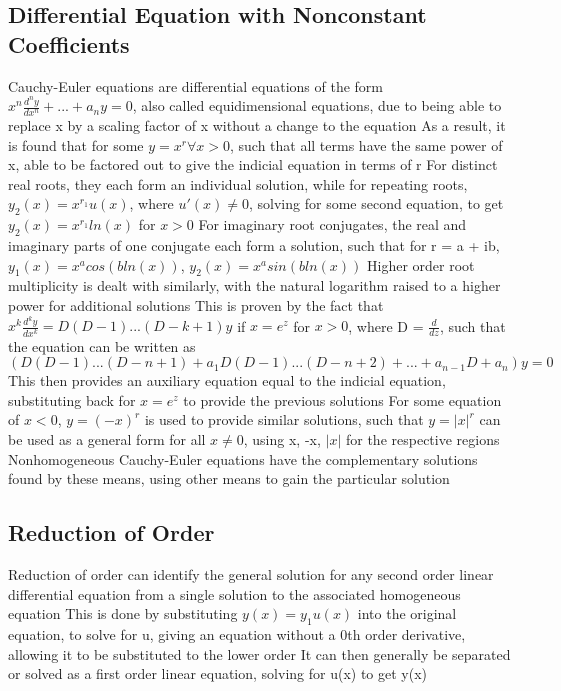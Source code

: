 \documentclass[11 pt, twoside]{article}
\newenvironment{outline*}
{
	\begin{outline}[enumerate]
	}
	{\end{outline}
}
\begin{document}
\subsection{Differential Equation with Nonconstant Coefficients}
\begin{outline*}
\1 Cauchy-Euler equations are differential equations of the form $x^n\frac{d^ny}{dx^n} + ... + a_ny = 0$, also called equidimensional equations, due to being able to replace x by a scaling factor of x without a change to the equation
\2 As a result, it is found that for some $y = x^r \forall x > 0$, such that all terms have the same power of x, able to be factored out to give the indicial equation in terms of r
\2 For distinct real roots, they each form an individual solution, while for repeating roots, $y_2(x) = x^{r_1}u(x)$, where $u'(x) \neq 0$, solving for some second equation, to get $y_2(x) = x^{r_1}ln(x)$ for $x > 0$
\3 For imaginary root conjugates, the real and imaginary parts of one conjugate each form a solution, such that for r = a + ib, $y_1(x) = x^a cos(b ln(x))$, $y_2(x) = x^a sin(b ln(x))$
\2 Higher order root multiplicity is dealt with similarly, with the natural logarithm raised to a higher power for additional solutions
\3 This is proven by the fact that $x^k\frac{d^ky}{dx^k} = D(D-1)...(D-k+1)y$ if $x = e^z$ for $x > 0$, where D = $\frac{d}{dz}$, such that the equation can be written as $(D(D - 1)...(D - n + 1) + a_1D(D - 1)...(D - n + 2) + ... + a_{n-1}D + a_n)y = 0$
\3 This then provides an auxiliary equation equal to the indicial equation, substituting back for $x = e^z$ to provide the previous solutions
\1 For some equation of $x < 0$, $y = (-x)^r$ is used to provide similar solutions, such that $y = |x|^r$ can be used as a general form for all $x \neq 0$, using x, -x, $|x|$ for the respective regions
\1 Nonhomogeneous Cauchy-Euler equations have the complementary solutions found by these means, using other means to gain the particular solution
\end{outline*}
\subsection{Reduction of Order}
\begin{outline*}
\1 Reduction of order can identify the general solution for any second order linear differential equation from a single solution to the associated homogeneous equation
\2 This is done by substituting $y(x) = y_1u(x)$ into the original equation, to solve for u, giving an equation without a 0th order derivative, allowing it to be substituted to the lower order
\2 It can then generally be separated or solved as a first order linear equation, solving for u(x) to get y(x)
\end{outline*}
\end{document}
